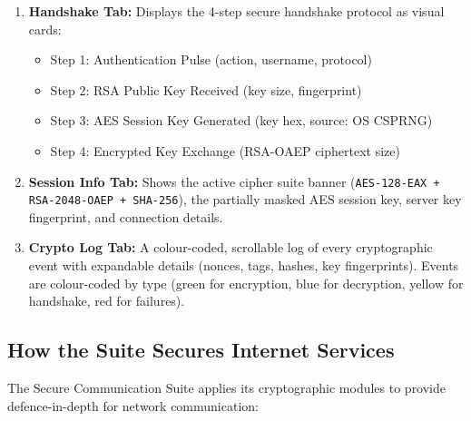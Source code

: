 \documentclass[12pt,a4paper]{article}
\begin{document}
\begin{enumerate}
    \item \textbf{Handshake Tab:} Displays the 4-step secure handshake protocol as visual cards:
    \begin{itemize}
        \item Step 1: Authentication Pulse (action, username, protocol)
        \item Step 2: RSA Public Key Received (key size, fingerprint)
        \item Step 3: AES Session Key Generated (key hex, source: OS CSPRNG)
        \item Step 4: Encrypted Key Exchange (RSA-OAEP ciphertext size)
    \end{itemize}

    \item \textbf{Session Info Tab:} Shows the active cipher suite banner (\texttt{AES-128-EAX + RSA-2048-OAEP + SHA-256}), the partially masked AES session key, server key fingerprint, and connection details.

    \item \textbf{Crypto Log Tab:} A colour-coded, scrollable log of every cryptographic event with expandable details (nonces, tags, hashes, key fingerprints). Events are colour-coded by type (green for encryption, blue for decryption, yellow for handshake, red for failures).
\end{enumerate}

\subsection{How the Suite Secures Internet Services}

The Secure Communication Suite applies its cryptographic modules to provide defence-in-depth for network communication:
\end{document}
